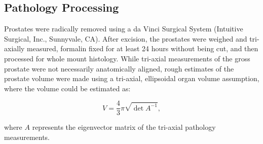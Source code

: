 \subsection{Pathology Processing}
Prostates were radically removed using a da Vinci Surgical System (Intuitive
Surgical\textregistered, Inc., Sunnyvale, CA).  After excision, the prostates
were weighed and tri-axially measured, formalin fixed for at least 24 hours
without being cut, and then processed for whole mount histology.  While
tri-axial measurements of the gross prostate were not necessarily anatomically
aligned, rough estimates of the prostate volume were made using a tri-axial,
ellipsoidal organ volume assumption, where the volume could be estimated as:

\begin{equation}\label{eqn:ellipsoid_volume}
V = \frac{4}{3}\pi \sqrt{\det{A^{-1}}},
\end{equation}

where $A$ represents the eigenvector matrix of the tri-axial pathology
measurements.

\textbf{}

